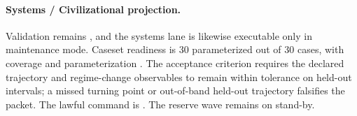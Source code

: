 \paragraph{Systems / Civilizational projection.}
Validation remains , and the systems lane is likewise executable
only in maintenance mode. Caseset readiness is 30 parameterized out of 30
cases, with coverage  and parameterization
. The acceptance criterion requires
the declared trajectory and regime-change observables to remain within
tolerance on held-out intervals; a missed turning point or out-of-band held-out
trajectory falsifies the packet. The lawful command is
. The reserve wave
 remains on stand-by.

\endgroup
